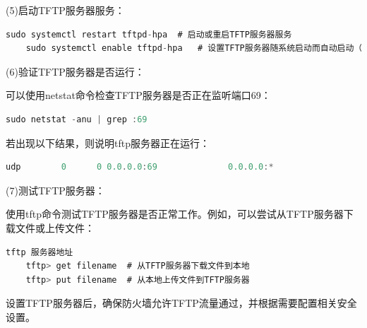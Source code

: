     (5)启动TFTP服务器服务：
    
     \begin{lstlisting}[language=rust]
    sudo systemctl restart tftpd-hpa  # 启动或重启TFTP服务器服务
    sudo systemctl enable tftpd-hpa   # 设置TFTP服务器随系统启动而自动启动（可选）	
     \end{lstlisting}
    
    (6)验证TFTP服务器是否运行：
    
    可以使用netstat命令检查TFTP服务器是否正在监听端口69：
    
    \begin{lstlisting}[language=rust]
    sudo netstat -anu | grep :69
    \end{lstlisting}
    
    若出现以下结果，则说明tftp服务器正在运行：
    
    \begin{lstlisting}[language=rust]
    udp        0      0 0.0.0.0:69              0.0.0.0:* 
    \end{lstlisting}
    
    (7)测试TFTP服务器：
    
    使用tftp命令测试TFTP服务器是否正常工作。例如，可以尝试从TFTP服务器下载文件或上传文件：
    
    \begin{lstlisting}[language=rust]
	tftp 服务器地址
	tftp> get filename  # 从TFTP服务器下载文件到本地
	tftp> put filename  # 从本地上传文件到TFTP服务器
    \end{lstlisting}
    
    设置TFTP服务器后，确保防火墙允许TFTP流量通过，并根据需要配置相关安全设置。

